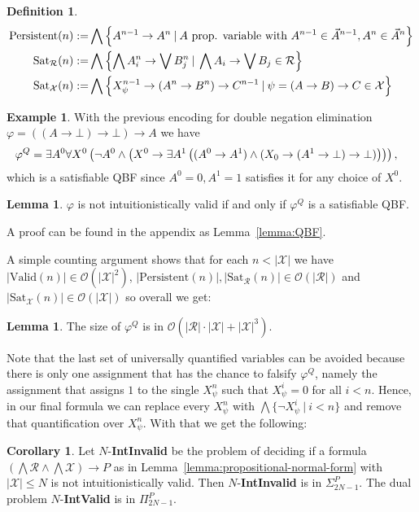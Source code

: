 \documentclass{easychair}
\theoremstyle{definition}
\theoremstyle{definition}
\newtheorem{corollary}[theorem]{Corollary}
\theoremstyle{definition}
\newtheorem{lemma}[theorem]{Lemma}
\theoremstyle{definition}
\theoremstyle{definition}
\newtheorem{definition}[theorem]{Definition}
\theoremstyle{definition}
\newtheorem{example}[theorem]{Example}
\theoremstyle{definition}
\begin{document}
\begin{definition}
\begin{align*}
		\text{\normalfont Persistent}(n) := & \bigwedge\left\{A^{n-1}\to A^n\:|\: A \text{ prop. variable with }A^{n-1}\in\vec A^{n-1}, A^n \in\vec A^{n}\right\}\\
		\text{\normalfont Sat}_{\mathcal R}(n) := &\bigwedge\left\{\bigwedge A^n_i\to\bigvee B^n_j\:|\:\bigwedge A_i\to\bigvee B_j \in \mathcal R\right\}\\
		\text{\normalfont Sat}_{\mathcal X}(n) := & \bigwedge\left\{X^{n-1}_\psi\to (A^n\to B^n)\to C^{n-1}\:|\:\psi = (A\to B)\to C\in\mathcal X\right\}
	\end{align*}
\end{definition}

\begin{example}
	With the previous encoding for double negation elimination $\varphi = ((A\to \bot)\to \bot)\to A$ we have
	$$\hspace*{-.3cm}
	\varphi^Q = \exists A^0\forall X^0\left(\neg A^0\wedge\left(X^0\to \exists A^1\left((A^0\to A^1)\wedge(X_0\to (A^1\to \bot)\to \bot)\right)\right)\right),
	$$
	which is a satisfiable QBF since $A^0 = 0, A^1 = 1$ satisfies it for any choice of $X^0$.
\end{example}


\begin{lemma}
	$\varphi$ is not intuitionistically valid if and only if $\varphi^Q$ is a satisfiable QBF.
\end{lemma}
A proof can be found in the appendix as Lemma~\ref{lemma:QBF}.

A simple counting argument shows that for each $n < |\mathcal X|$ we have $|\text{Valid}(n)|\in \mathcal O(|\mathcal X|^2)$, $|\text{Persistent}(n)|, |\text{Sat}_{\mathcal R}(n)|\in \mathcal O(|\mathcal R|)$ and $|\text{Sat}_{\mathcal X}(n)|\in \mathcal O(|\mathcal X|)$ so overall we get:
\begin{lemma}
	The size of $\varphi^Q$ is in $\mathcal O(|\mathcal R|\cdot|\mathcal X| + |\mathcal X|^3)$.
\end{lemma}

Note that the last set of universally quantified variables can be avoided because there is only one assignment that has the chance to falsify $\varphi^Q$, namely the assignment that assigns $1$ to the single $X_\psi^n$ such that $X_\psi^i = 0$ for all $i < n$. Hence, in our final formula we can replace every $X_\psi^n$ with $\bigwedge\{\neg X_\psi^i\:|\:i < n\}$ and remove that quantification over $X_\psi^n$. With that we get the following:

\begin{corollary}
	Let $N$-\textbf{IntInvalid} be the problem of deciding if a formula $(\bigwedge \mathcal R\wedge\bigwedge\mathcal X)\to P$ as in Lemma~\ref{lemma:propositional-normal-form} with $|\mathcal X|\leq N$ is not intuitionistically valid. Then $N$-\textbf{IntInvalid} is in $\Sigma_{2N-1}^P$. The dual problem $N$-\textbf{IntValid} is in $\Pi_{2N-1}^P$.
\end{corollary}
\end{document}
